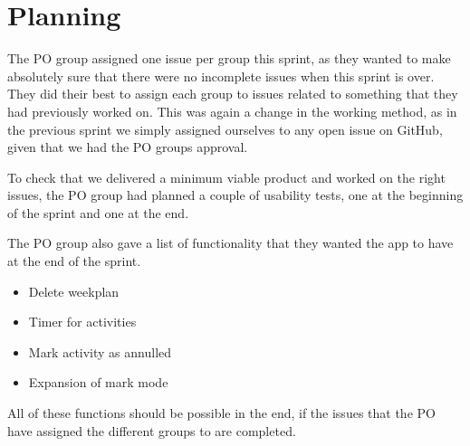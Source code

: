 \section{Planning}
The PO group assigned one issue per group this sprint, as they wanted to make absolutely sure that there were no incomplete issues when this sprint is over. 
They did their best to assign each group to issues related to something that they had previously worked on.
This was again a change in the working method, as in the previous sprint we simply assigned ourselves to any open issue on GitHub, given that we had the PO groups approval.

To check that we delivered a minimum viable product and worked on the right issues, the PO group had planned a couple of usability tests, one at the beginning of the sprint and one at the end.

The PO group also gave a list of functionality that they wanted the app to have at the end of the sprint.

\begin{itemize}
  \item Delete weekplan
  \item Timer for activities
  \item Mark activity as annulled 
  \item Expansion of mark mode
\end{itemize}

All of these functions should be possible in the end, if the issues that the PO have assigned the different groups to are completed.
